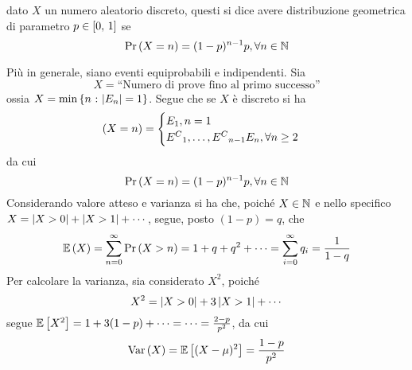 \documentclass{subfiles}
\begin{document}
\begin{Definition*}
    dato \(X\) un numero aleatorio discreto, questi si dice avere distribuzione geometrica di parametro \(p \in \Range*{0}{1}\) se
    \[
        \Prob{X = n} = (1 - p)^{n - 1} p, \forall n \in \Natural
    \]
\end{Definition*}
Più in generale, siano  eventi equiprobabili e indipendenti. Sia
\[
    X = \text{``Numero di prove fino al primo successo''}
\]
ossia \(X = \Min{n}[\Abs{E_{n}} = 1]\). Segue che se \(X\) è discreto si ha
\[
    (X = n) = \begin{cases}
        E_{1}, n = 1 \\
        \List{{E^{C}}}{1}{n - 1}E_{n}, \forall n \ge 2
    \end{cases}
\]
da cui
\[
    \Prob{X = n} =(1 - p)^{n - 1}p, \forall n \in \Natural
\]
Considerando valore atteso e varianza si ha che, poiché \(X \in \operatorname{\mathbb{N}}\) e nello specifico \(X = \left\vert {X > 0} \right\vert + \left\vert {X > 1} \right\vert + \cdots\),
segue, posto \((1 - p) = q\), che
\[
    \Expected{X} = \Sum{\Prob{X > n}}{n = 0}[\infty]  = 1 + q + q^{2} + \cdots = \Sum{q_{i}}{i = 0}[\infty] = \Frac{1}{1 - q}
\]
Per calcolare la varianza, sia considerato \(X^{2}\), poiché
\[
    X^{2} = \left\vert {X > 0} \right\vert + 3 \left\vert {X > 1} \right\vert + \cdots
\]
segue \(\Expected*{X^{2}} = 1 + 3(1 - p) + \cdots = \cdots = \tfrac{2 - p}{p^{2}}\), da cui
\[
    \Var{X} = \Expected*{(X - \mu)^{2}} = \Frac{1 - p}{p^{2}}
\]
\end{document}
